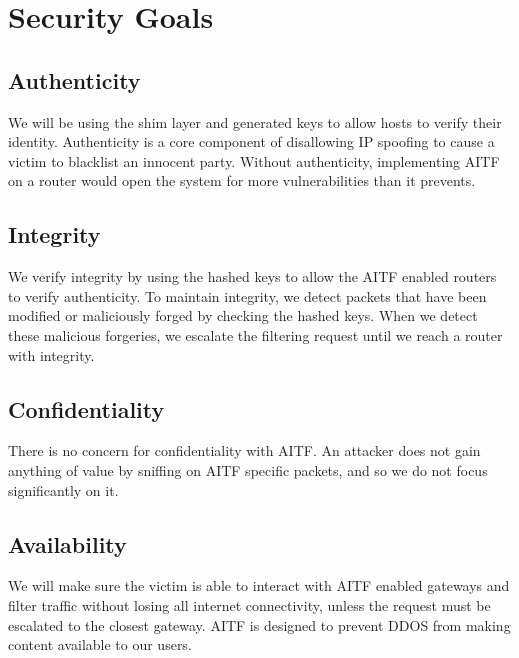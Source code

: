 \documentclass[11pt]{article}
\begin{document}
\section{Security Goals}
	\subsection{Authenticity}
	We will be using the shim layer and generated keys to allow hosts to verify their identity. Authenticity is a core component of disallowing IP spoofing to cause a victim to blacklist an innocent party. Without authenticity, implementing AITF on a router would open the system for more vulnerabilities than it prevents.
	\subsection{Integrity}
	We verify integrity by using the hashed keys to allow the AITF enabled routers to verify authenticity. To maintain integrity, we detect packets that have been modified or maliciously forged by checking the hashed keys. When we detect these malicious forgeries, we escalate the filtering request until we reach a router with integrity. 
	\subsection{Confidentiality}
	There is no concern for confidentiality with AITF. An attacker does not gain anything of value by sniffing on AITF specific packets, and so we do not focus significantly on it.
	\subsection{Availability}
	We will make sure the victim is able to interact with AITF enabled gateways and filter traffic without losing all internet connectivity, unless the request must be escalated to the closest gateway. AITF is designed to prevent DDOS from making content available to our users.
\end{document}
